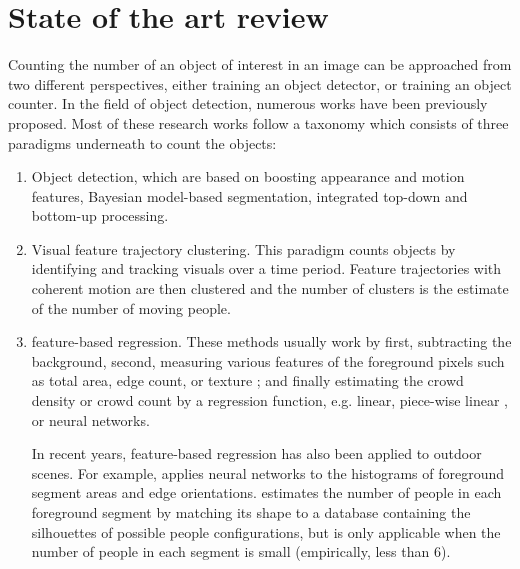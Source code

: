 \newpage
\chapter{State of the art review}

\label{sec:stateoftheart}
Counting the number of an object of interest in an image can be approached from two different perspectives, either training an object detector, or training an object counter\cite{segui2015learning}. In the field of object detection, numerous works have been previously proposed\cite{paragios2001mrf, cho1999neural, regazzoni1996distributed, davies1995crowd, kong2005counting, marana1998efficacy, viola2004robust}. Most of these research works follow a taxonomy which consists of three paradigms underneath to count the objects:
\begin{enumerate}
	\item Object detection, which are based on boosting appearance and motion features\cite{viola2005detecting, viola2004robust}, Bayesian model-based segmentation\cite{zhao2003bayesian}, integrated top-down and bottom-up processing\cite{leibe2005pedestrian, oliva2003top}\cite{chan2008privacy}.
	\item Visual feature trajectory clustering. This paradigm counts objects by identifying and tracking visuals over a  time period. Feature trajectories with coherent motion are then clustered and the number of clusters is the estimate of the number of moving people\cite{rabaud2006counting, brostow2006unsupervised}\cite{chan2008privacy}. 
	\item feature-based regression. These methods usually work by first, subtracting the background, second, measuring various features of the foreground pixels such as total area\cite{paragios2001mrf, davies1995crowd}, edge count\cite{cho1999neural, regazzoni1996distributed}, or texture \cite{marana1998efficacy}; and finally estimating the crowd density or crowd count by a regression function, e.g. linear\cite{paragios2001mrf, davies1995crowd}, piece-wise linear \cite{regazzoni1996distributed}, or neural networks\cite{cho1999neural, regazzoni1996distributed}. 

	\indent In recent years, feature-based regression has also been applied to outdoor scenes. For example, \citealt{kong2005counting} applies neural networks to the histograms of foreground segment areas and edge orientations. \citealt{dong2007fast} estimates the number of people in each foreground segment by matching its shape to a database containing the silhouettes of possible people configurations, but is only applicable when the number of people in each segment is small (empirically, less than 6)\cite{chan2008privacy}.  
\end{enumerate} 
